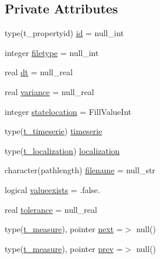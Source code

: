 \subsection*{Private Attributes}
\begin{DoxyCompactItemize}
\item 
type(t\+\_\+propertyid) \mbox{\hyperlink{structmodulesequentialassimilation_1_1t__measure_a9dcc0d0d6e7fcd1eb5c91f3e76bb78ba}{id}} = null\+\_\+int
\item 
integer \mbox{\hyperlink{structmodulesequentialassimilation_1_1t__measure_ad886b69d18b67869bf5d06432d73c4ca}{filetype}} = null\+\_\+int
\item 
real \mbox{\hyperlink{structmodulesequentialassimilation_1_1t__measure_a162e10fbacd217c3cd8a339b4f7400e0}{dt}} = null\+\_\+real
\item 
real \mbox{\hyperlink{structmodulesequentialassimilation_1_1t__measure_a5c6311153db1b6e9356b76e187a08d57}{variance}} = null\+\_\+real
\item 
integer \mbox{\hyperlink{structmodulesequentialassimilation_1_1t__measure_a9bc78acd25fbcfd85178b05d7bcab6df}{statelocation}} = Fill\+Value\+Int
\item 
type(\mbox{\hyperlink{structmodulesequentialassimilation_1_1t__timeserie}{t\+\_\+timeserie}}) \mbox{\hyperlink{structmodulesequentialassimilation_1_1t__measure_a2e753669abe6b7ed88a86c2d9d371ff7}{timeserie}}
\item 
type(\mbox{\hyperlink{structmodulesequentialassimilation_1_1t__localization}{t\+\_\+localization}}) \mbox{\hyperlink{structmodulesequentialassimilation_1_1t__measure_a5f3ecd0fcec7f657ffc48236d13c198c}{localization}}
\item 
character(pathlength) \mbox{\hyperlink{structmodulesequentialassimilation_1_1t__measure_a9e5ff3ad51617f08f35cb059ec9a1af9}{filename}} = null\+\_\+str
\item 
logical \mbox{\hyperlink{structmodulesequentialassimilation_1_1t__measure_aaa0cabfe092717b9fcc26d1ff6ee5e23}{valueexists}} = .false.
\item 
real \mbox{\hyperlink{structmodulesequentialassimilation_1_1t__measure_a19dcbca26cab96f3d1fec7b0aef428f9}{tolerance}} = null\+\_\+real
\item 
type(\mbox{\hyperlink{structmodulesequentialassimilation_1_1t__measure}{t\+\_\+measure}}), pointer \mbox{\hyperlink{structmodulesequentialassimilation_1_1t__measure_a420bd9edbc2fd78f7554d46270c8b628}{next}} =$>$ null()
\item 
type(\mbox{\hyperlink{structmodulesequentialassimilation_1_1t__measure}{t\+\_\+measure}}), pointer \mbox{\hyperlink{structmodulesequentialassimilation_1_1t__measure_ab0838cea22c63f6bb20488dadc4638b2}{prev}} =$>$ null()
\end{DoxyCompactItemize}



